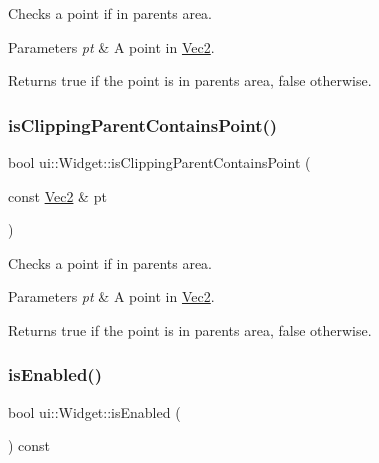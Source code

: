 Checks a point if in parent\textquotesingle{}s area.


\begin{DoxyParams}{Parameters}
{\em pt} & A point in {\ttfamily \hyperlink{classVec2}{Vec2}}. \\
\hline
\end{DoxyParams}
\begin{DoxyReturn}{Returns}
true if the point is in parent\textquotesingle{}s area, false otherwise. 
\end{DoxyReturn}
\mbox{\label{classui_1_1Widget_a13fbdff1391a7936b8fd26d9257fc071}} 
\subsubsection{\texorpdfstring{is\+Clipping\+Parent\+Contains\+Point()}{isClippingParentContainsPoint()}\hspace{0.1cm}{\footnotesize\ttfamily [2/2]}}
{\footnotesize\ttfamily bool ui\+::\+Widget\+::is\+Clipping\+Parent\+Contains\+Point (\begin{DoxyParamCaption}\item[{const \hyperlink{classVec2}{Vec2} \&}]{pt }\end{DoxyParamCaption})}

Checks a point if in parent\textquotesingle{}s area.


\begin{DoxyParams}{Parameters}
{\em pt} & A point in {\ttfamily \hyperlink{classVec2}{Vec2}}. \\
\hline
\end{DoxyParams}
\begin{DoxyReturn}{Returns}
true if the point is in parent\textquotesingle{}s area, false otherwise. 
\end{DoxyReturn}
\mbox{\label{classui_1_1Widget_a483d1547b7786c8a8da795f1f2ca1342}} 
\subsubsection{\texorpdfstring{is\+Enabled()}{isEnabled()}\hspace{0.1cm}{\footnotesize\ttfamily [1/2]}}
{\footnotesize\ttfamily bool ui\+::\+Widget\+::is\+Enabled (\begin{DoxyParamCaption}{ }\end{DoxyParamCaption}) const}

